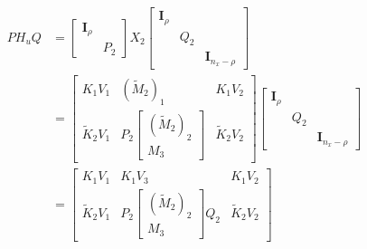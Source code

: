 \documentclass{article}
\begin{document}
\begin{align}
    P H_u Q &= \begin{bmatrix} \bm{I}_\rho & \\ & P_2\end{bmatrix}
    X_2
    \begin{bmatrix}\bm{I}_\rho & & \\ & Q_2 & \\ & & \bm{I}_{n_x-\rho} \end{bmatrix}\\
    &= \begin{bmatrix} K_1 V_1 & (\tilde{M}_2)_1 & K_1 V_2 \\ \tilde{K}_2 V_1 & P_2 \begin{bmatrix} (\tilde{M}_2)_2\\ M_3 \end{bmatrix} & \tilde{K}_2 V_2 \end{bmatrix}
    \begin{bmatrix}\bm{I}_\rho & & \\ & Q_2 & \\ & & \bm{I}_{n_x-\rho} \end{bmatrix}\\
    &= \begin{bmatrix} K_1 V_1 & K_1 V_3 & K_1 V_2 \\ \tilde{K}_2 V_1 & P_2 \begin{bmatrix} (\tilde{M}_2)_2\\ M_3 \end{bmatrix} Q_2 & \tilde{K}_2 V_2 \end{bmatrix}
    \label{eq:left-hand-side-carry}
\end{align}
\end{document}

